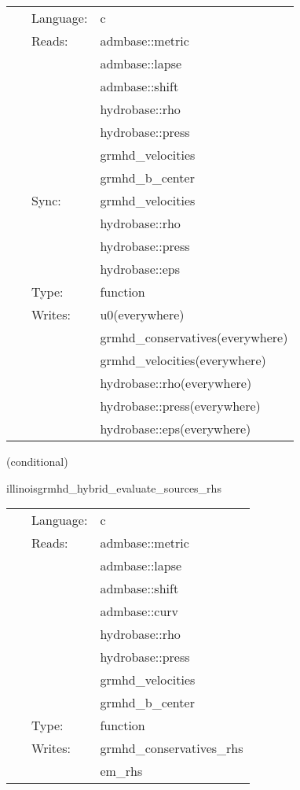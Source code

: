  \begin{tabular*}{160mm}{cll} 
~ & Language:  & c \\ 
~ & Reads:  & admbase::metric \\ 
~& ~ &admbase::lapse\\ 
~& ~ &admbase::shift\\ 
~& ~ &hydrobase::rho\\ 
~& ~ &hydrobase::press\\ 
~& ~ &grmhd\_velocities\\ 
~& ~ &grmhd\_b\_center\\ 
~ & Sync:  & grmhd\_velocities \\ 
~& ~ &hydrobase::rho\\ 
~& ~ &hydrobase::press\\ 
~& ~ &hydrobase::eps\\ 
~ & Type:  & function \\ 
~ & Writes:  & u0(everywhere) \\ 
~& ~ &grmhd\_conservatives(everywhere)\\ 
~& ~ &grmhd\_velocities(everywhere)\\ 
~& ~ &hydrobase::rho(everywhere)\\ 
~& ~ &hydrobase::press(everywhere)\\ 
~& ~ &hydrobase::eps(everywhere)\\ 
\end{tabular*} 


\vspace{5mm}

   (conditional) 

\hspace{5mm} illinoisgrmhd\_hybrid\_evaluate\_sources\_rhs 

\hspace{5mm}{\it hybrid version of illinoisgrmhd\_evaluate\_sources\_rhs } 


\hspace{5mm}

 \begin{tabular*}{160mm}{cll} 
~ & Language:  & c \\ 
~ & Reads:  & admbase::metric \\ 
~& ~ &admbase::lapse\\ 
~& ~ &admbase::shift\\ 
~& ~ &admbase::curv\\ 
~& ~ &hydrobase::rho\\ 
~& ~ &hydrobase::press\\ 
~& ~ &grmhd\_velocities\\ 
~& ~ &grmhd\_b\_center\\ 
~ & Type:  & function \\ 
~ & Writes:  & grmhd\_conservatives\_rhs \\ 
~& ~ &em\_rhs\\ 
\end{tabular*} 


